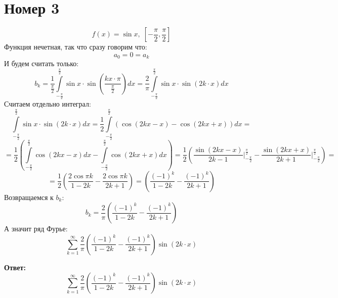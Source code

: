 \documentclass[a4paper,12pt]{article}
\begin{document}
\section*{Номер 3}
\[
f(x) = \sin x, \; \left[ -\frac{\pi}{2}, \frac{\pi}{2} \right]
\]
Функция нечетная, так что сразу говорим что:
\[
a_0 = 0 = a_k 
\]
И будем считать только:
\[
b_k = \frac{1}{\frac{\pi}{2}} \int\limits_{-\frac{\pi}{2}}^{\frac{\pi}{2}} \sin x \cdot \sin \left( \frac{k x \cdot \pi}{\frac{\pi}{2}}\right)dx =  \frac{2}{\pi}
\int\limits_{-\frac{\pi}{2}}^{\frac{\pi}{2}} \sin x \cdot \sin \left( 2k \cdot x\right)dx
\]
Считаем отдельно интеграл:
\[
\int\limits_{-\frac{\pi}{2}}^{\frac{\pi}{2}} \sin x \cdot \sin \left( 2k \cdot x\right)dx = \frac{1}{2}  \int\limits_{-\frac{\pi}{2}}^{\frac{\pi}{2}} \left(\cos (2kx - x) - \cos (2kx + x) \right)dx = 
\]
\[
=
\frac{1}{2} 
\left( 
\int\limits_{-\frac{\pi}{2}}^{\frac{\pi}{2}} \cos (2kx - x)  dx
-
\int\limits_{-\frac{\pi}{2}}^{\frac{\pi}{2}} \cos (2kx + x) dx
\right)
=
\frac{1}{2}
 \left(
\frac{\sin (2k x - x)}{2k - 1} \Bigg|_{-\frac{\pi}{2}}^{\frac{\pi}{2}}
-
\frac{\sin (2k x +x)}{2k + 1} \Bigg|_{-\frac{\pi}{2}}^{\frac{\pi}{2}}
\right) = 
\]
\[
=
\frac{1}{2}
\left(
\frac{2 \cos \pi k}{1 - 2k}
-
\frac{2 \cos \pi k}{2k + 1}
\right)
=
\left(
\frac{(-1)^k}{1 - 2k}
-
\frac{(-1)^k}{2k + 1}
\right)
\]
Возвращаемся к $b_k$:
\[
b_k = \frac{2}{\pi}\left(
\frac{(-1)^k}{1 - 2k}
-
\frac{(-1)^k}{2k + 1}
\right)
\]
А значит ряд Фурье:
\[
\sum_{k=1}^{\infty}
\frac{2}{\pi}\left(
\frac{(-1)^k}{1 - 2k}
-
\frac{(-1)^k}{2k + 1}
\right) \sin (2k \cdot x)
\]
\begin{center}
\textbf{Ответ: } 
\[
\sum_{k=1}^{\infty}
\frac{2}{\pi}\left(
\frac{(-1)^k}{1 - 2k}
-
\frac{(-1)^k}{2k + 1}
\right) \sin (2k \cdot x)
\]
\end{center}
\end{document}
